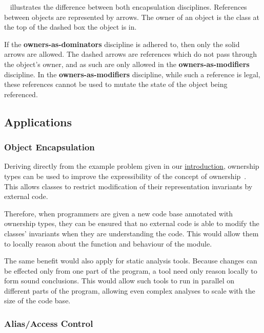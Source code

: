 \documentclass{acm_proc_article-sp}
\begin{document}
~\cite{dietl09gut} illustrates the
difference between both encapsulation disciplines. References between objects
are represented by arrows. The owner of an object is the class at the top of
the dashed box the object is in.

If the \textbf{owners-as-dominators} discipline is adhered to, then \linebreak
only the solid arrows are allowed. The dashed arrows are references which do
not pass through the object's owner, and as such are only allowed in the
\textbf{owners-as-modifiers} discipline. In the \textbf{owners-as-modifiers}
discipline, while such a reference is legal, these references cannot be used to
mutate the state of the object being referenced.

\subsection{Applications}
\label{subsec:applications}

\subsubsection{Object Encapsulation}
\label{subsubsec:object_encapsulation}

Deriving directly from the example problem given in our
\hyperref[code:modular_reasoning_car_engine_1]{introduction}, ownership types
can be used to improve the expressibility of the concept of
ownership~\cite{clarke98ownership}. This allows classes to restrict
modification of their representation invariants by external code.

Therefore, when programmers are given a new code base annotated with ownership
types, they can be ensured that no external code is able to modify the classes'
invariants when they are understanding the code. This would allow them to
locally reason about the function and behaviour of the module.

The same benefit would also apply for static analysis tools. Because changes can
be effected only from one part of the program, a tool need only reason locally
to form sound conclusions. This would allow such tools to run in parallel on
different parts of the program, allowing even complex analyses to scale with the
size of the code base.

\subsubsection{Alias/Access Control}
\label{subsubsec:alias_control}
\end{document}
